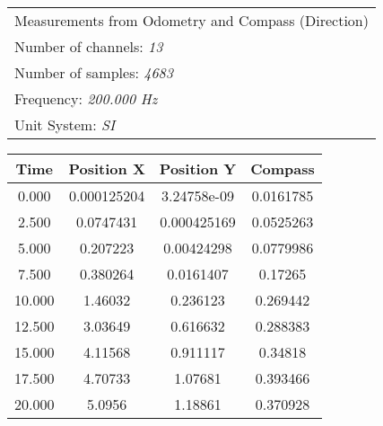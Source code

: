 \documentclass[]{article}
\begin{document}
	\begin{table}[H]
	\begin{center}
		\begin{tabular}{l}
			\toprule 
			\footnotesize Measurements from Odometry and Compass (Direction)\\
			\footnotesize Number of channels: \textit{13} \\
			\footnotesize Number of samples: \textit{4683} \\
			\footnotesize Frequency: \textit{200.000 Hz} \\
			\footnotesize Unit System: \textit{SI} \\
		\end{tabular}
		
		\begin{tabular}{cccc}
			\toprule
			
			\footnotesize Time & \footnotesize Position X & \footnotesize Position Y & \footnotesize Compass \\
			\midrule
			
			\footnotesize 0.000 & \footnotesize 0.000125204 & \footnotesize 3.24758e-09 & \footnotesize 0.0161785 \\
			
			\footnotesize 2.500 & \footnotesize 0.0747431 & \footnotesize 0.000425169 & \footnotesize 0.0525263 \\
			
			\footnotesize 5.000 & \footnotesize 0.207223 & \footnotesize 0.00424298 & \footnotesize 0.0779986 \\
			
			\footnotesize 7.500 & \footnotesize 0.380264 & \footnotesize 0.0161407 & \footnotesize 0.17265 \\
			
			\footnotesize 10.000 & \footnotesize 1.46032 & \footnotesize 0.236123 & \footnotesize 0.269442 \\
			
			\footnotesize 12.500 & \footnotesize 3.03649 & \footnotesize 0.616632 & \footnotesize 0.288383 \\
			
			\footnotesize 15.000 & \footnotesize 4.11568 & \footnotesize 0.911117 & \footnotesize 0.34818 \\
			
			\footnotesize 17.500 & \footnotesize 4.70733 & \footnotesize 1.07681 & \footnotesize 0.393466 \\
			
			\footnotesize 20.000 & \footnotesize 5.0956 & \footnotesize 1.18861 & \footnotesize 0.370928 \\
			

\end{tabular}
\end{center}
\end{table}
\end{document}
